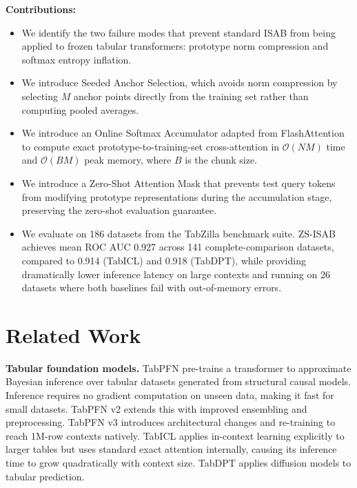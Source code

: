 \documentclass{article}
\begin{document}
\textbf{Contributions:}
\begin{itemize}
    \item We identify the two failure modes that prevent standard ISAB from being applied to frozen tabular transformers: prototype norm compression and softmax entropy inflation.
    \item We introduce Seeded Anchor Selection, which avoids norm compression by selecting $M$ anchor points directly from the training set rather than computing pooled averages.
    \item We introduce an Online Softmax Accumulator adapted from FlashAttention \citep{dao2022flashattention} to compute exact prototype-to-training-set cross-attention in $\mathcal{O}(NM)$ time and $\mathcal{O}(BM)$ peak memory, where $B$ is the chunk size.
    \item We introduce a Zero-Shot Attention Mask that prevents test query tokens from modifying prototype representations during the accumulation stage, preserving the zero-shot evaluation guarantee.
    \item We evaluate on 186 datasets from the TabZilla benchmark suite. ZS-ISAB achieves mean ROC AUC 0.927 across 141 complete-comparison datasets, compared to 0.914 (TabICL) and 0.918 (TabDPT), while providing dramatically lower inference latency on large contexts and running on 26 datasets where both baselines fail with out-of-memory errors.
\end{itemize}

\section{Related Work}

\textbf{Tabular foundation models.}
TabPFN \citep{hollmann2022tabpfn} pre-trains a transformer to approximate Bayesian inference over tabular datasets generated from structural causal models. Inference requires no gradient computation on unseen data, making it fast for small datasets. TabPFN v2 \citep{hollmann2025tabpfn2} extends this with improved ensembling and preprocessing. TabPFN v3 \citep{hollmann2025tabpfn3} introduces architectural changes and re-training to reach 1M-row contexts natively. TabICL \citep{huang2024tabicl} applies in-context learning explicitly to larger tables but uses standard exact attention internally, causing its inference time to grow quadratically with context size. TabDPT \citep{ma2024tabdpt} applies diffusion models to tabular prediction.
\end{document}
